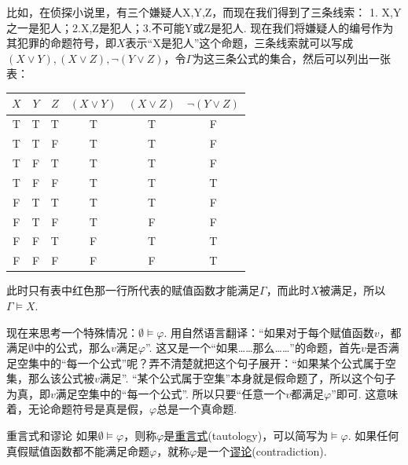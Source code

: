 \documentclass[main.tex]{subfiles}
\begin{document}
\begin{note}
    比如，在侦探小说里，有三个嫌疑人X,Y,Z，而现在我们得到了三条线索：
    1. X,Y之一是犯人；2.X,Z是犯人；3.不可能Y或Z是犯人. 现在我们将嫌疑人的编号作为其犯罪的命题符号，即\(X\)表示“X是犯人”这个命题，三条线索就可以写成\((X \vee Y), (X \vee Z), \neg(Y \vee Z)\)，令\(\Gamma\)为这三条公式的集合，然后可以列出一张表：
    \begin{center}
        \begin{tabular}{ccc|ccc}
            \hline
            \(X\) & \(Y\) & \(Z\) & \((X \vee Y)\) & \((X \vee Z)\) & \(\neg(Y \vee Z)\) \\
            \hline
            T & T & T & T & T & F \\
            T & T & F & T & T & F \\
            T & F & T & T & T & F \\
            {\color{red}T} & {\color{red}F} & {\color{red}F} & {\color{red}T} & {\color{red}T} & {\color{red}T} \\
            F & T & T & T & T & F \\
            F & T & F & T & F & F \\
            F & F & T & F & T & T \\
            F & F & F & F & F & T \\
            \hline
        \end{tabular}
    \end{center}
    此时只有表中红色那一行所代表的赋值函数才能满足\(\Gamma\)，而此时\(X\)被满足，所以\(\Gamma \vDash X\). 
\end{note}

现在来思考一个特殊情况：\(\emptyset \vDash \varphi\). 用自然语言翻译：“如果对于每个赋值函数\(v\)，都满足\(\emptyset\)中的公式，那么\(v\)满足\(\varphi\)”. 这又是一个“如果……那么……”的命题，首先\(v\)是否满足空集中的“每一个公式”呢？弄不清楚就把这个句子展开：“如果某个公式属于空集，那么该公式被\(v\)满足”. “某个公式属于空集”本身就是假命题了，所以这个句子为真，即\(v\)满足空集中的“每一个公式”. 所以只要“任意一个\(v\)都满足\(\varphi\)”即可. 这意味着，无论命题符号是真是假，\(\varphi\)总是一个真命题.

\begin{definition}{重言式和谬论}
    如果\(\emptyset \vDash \varphi\)，则称\(\varphi\)是\uline{重言式}(tautology)，可以简写为\(\vDash \varphi\). \newline
    如果任何真假赋值函数都不能满足命题\(\varphi\)，就称\(\varphi\)是一个\uline{谬论}(contradiction).
\end{definition}
\end{document}

